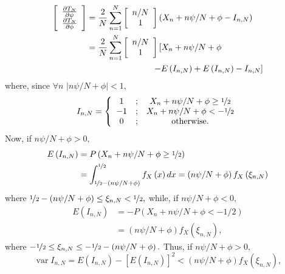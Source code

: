 \documentclass[journal]{IEEEtran}
\begin{document}
\begin{IEEEproof}
\begin{align*}
\left[
\begin{array}
[c]{c}%
\frac{\partial T_{N}}{\partial\psi}\\
\frac{\partial T_{N}}{\partial\phi}%
\end{array}
\right]   &  =\frac{2}{N}\sum_{n=1}^{N}\left[
\begin{array}
[c]{c}%
n/N\\
1
\end{array}
\right]  \left(  X_{n}+n\psi/N+\phi-I_{n,N}\right)  \\
&  =\frac{2}{N}\sum_{n=1}^{N}\left[
\begin{array}
[c]{c}%
n/N\\
1
\end{array}
\right]  \left[  X_{n}+n\psi/N+\phi \right. \\ 
&\left. \hspace{2.7cm} -E\left(  I_{n,N}\right)  +E\left(
I_{n,N}\right)  -I_{n,N}\right]
\end{align*}
where, since $\forall n$ $\left\vert n\psi/N+\phi\right\vert <1,$%
\[
I_{n,N}=\left\{
\begin{array}
[c]{ccc}%
1 & ; & X_{n}+n\psi/N+\phi\geq \nicefrac{1}{2}\\
-1 & ; & X_{n}+n\psi/N+\phi<-\nicefrac{1}{2}\\
0 & ; & \text{otherwise.}%
\end{array}
\right.
\]
Now, if $n\psi/N+\phi>0,$%
\begin{align}
E\left(  I_{n,N}\right)   &  =P\left(  X_{n}+n\psi/N+\phi\geq \nicefrac{1}{2} \right)
\label{eq:one1}\\
&  =\int_{\nicefrac{1}{2}-\left(  n\psi/N+\phi\right)  }^{\nicefrac{1}{2}}f_X \left(  x\right)
dx 
 =\left(  n\psi/N+\phi\right)  f_X \left(  \xi_{n,N}\right) \nonumber
\end{align}
where $\nicefrac{1}{2}-\left(  n\psi/N+\phi\right)  \leq\xi_{n,N} < \nicefrac{1}{2},$ while, if
$n\psi/N+\phi<0,$%
\begin{align}
E\left(  I_{n,N}\right)   &  =-P\left(  X_{n}+n\psi/N+\phi<-1/2\right)
\label{eq:one2}\\
&  =\left(  n\psi/N+\phi\right)  f_X \left(  \xi_{n,N}\right)  ,\nonumber
\end{align}
where $-\nicefrac{1}{2}\leq\xi_{n,N}\leq-\nicefrac{1}{2}-\left(  n\psi/N+\phi\right)  .$ Thus, if
$n\psi/N+\phi>0,$
\[
\operatorname{var}I_{n,N} =E\left(  I_{n,N}\right)  -\left[  E\left(
I_{n,N}\right)  \right]  ^{2}  <\left(  n\psi/N+\phi\right)  f_X \left(  \xi_{n,N}\right)  ,
\]
\end{IEEEproof}
\end{document}
